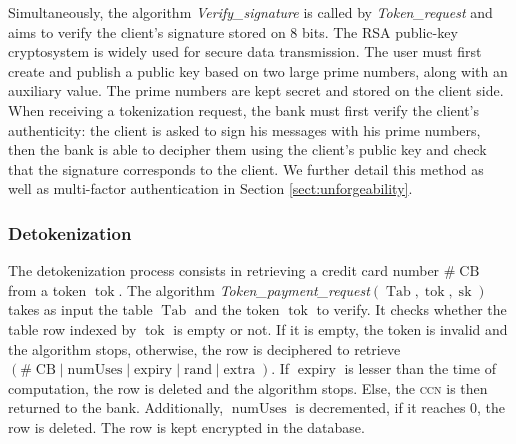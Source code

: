 \documentclass{llncs}
\DeclareMathOperator{\numUses}{numUses}
\DeclareMathOperator{\Tab}{Tab}
\DeclareMathOperator{\CB}{CB}
\DeclareMathOperator{\expiry}{expiry}
\DeclareMathOperator{\extra}{extra}
\DeclareMathOperator{\rand}{rand}
\DeclareMathOperator{\sk}{sk}
\DeclareMathOperator{\tok}{tok}
\begin{document}
Simultaneously, the algorithm \textit{Verify\_signature} is called by \textit{Token\_request} and aims to verify the client's signature stored on 8 bits. The RSA public-key cryptosystem is widely used for secure data transmission. The user must first create and publish a public key based on two large prime numbers, along with an auxiliary value. The prime numbers are kept secret and stored on the client side. When receiving a tokenization request, the bank must first verify the client's authenticity: the client is asked to sign his messages with his prime numbers, then the bank is able to decipher them using the client's public key and check that the signature corresponds to the client. We further detail this method as well as multi-factor authentication in Section \ref{sect:unforgeability}.

\subsubsection{Detokenization}
The detokenization process consists in retrieving a credit card number $\#\CB$ from a token $\tok$. The algorithm \textit{Token\_payment\_request}$(\Tab, \tok, \sk)$ takes as input the table $\Tab$ and the token $\tok$ to verify. It checks whether the table row indexed by $\tok$ is empty or not. If it is empty, the token is invalid and the algorithm stops, otherwise, the row is deciphered to retrieve $(\#\CB | \numUses | \expiry | \rand | \extra)$. If $\expiry$ is lesser than the time of computation, the row is deleted and the algorithm stops. Else, the \textsc{ccn} is then returned to the bank. Additionally, $\numUses$ is decremented, if it reaches 0, the row is deleted. The row is kept encrypted in the database.
\end{document}
